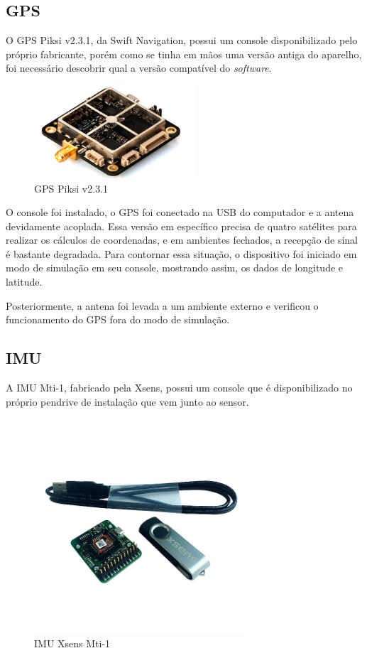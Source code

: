     \subsection{GPS}
    
	    O GPS Piksi v2.3.1, da Swift Navigation, possui um console disponibilizado pelo próprio fabricante, porém como se tinha em mãos uma versão antiga do aparelho, foi necessário descobrir qual a versão compatível do \textit{software}.
	    
	    \begin{figure}[!ht]
				   \centering
				   \includegraphics[width=6cm]{Figures/gps.jpg}
				   \caption{GPS Piksi v2.3.1}
				   \label{fig:GPS}
		\end{figure}
			    
	     O console foi instalado, o GPS foi conectado na USB do computador e a antena devidamente acoplada. Essa versão em específico precisa de quatro satélites para realizar os cálculos de coordenadas, e em ambientes fechados, a recepção de sinal é bastante degradada. Para contornar essa situação, o dispositivo foi iniciado em modo de simulação em seu console, mostrando assim, os dados de longitude e latitude.
	     
	     Posteriormente, a antena foi levada a um ambiente externo e verificou o funcionamento do GPS fora do modo de simulação.    

	\subsection{IMU}
	    
	    A IMU Mti-1, fabricado pela Xsens, possui um console que é disponibilizado no próprio pendrive de instalação que vem junto ao sensor.
	    
	    \begin{figure}[!ht]
		   \centering
		   \includegraphics[width=8cm]{Figures/imu.jpg}
		   \caption{IMU Xsens Mti-1}
		   \label{fig:IMU}
		\end{figure}
	    
